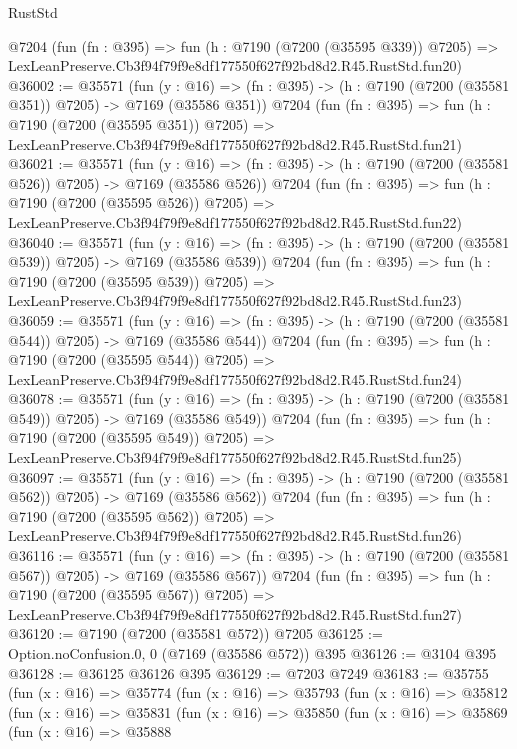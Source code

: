 \begin{lexlean}{RustStd}
\begin{coremodule}
    @7204
    (fun (fn : @395) =>
    fun (h : @7190 (@7200 (@35595 @339)) @7205) =>
    LexLeanPreserve.Cb3f94f79f9e8df177550f627f92bd8d2.R45.RustStd.fun20)
@36002 := @35571
    (fun (y : @16) => (fn : @395) -> (h : @7190 (@7200 (@35581 @351)) @7205) -> @7169 (@35586 @351))
    @7204
    (fun (fn : @395) =>
    fun (h : @7190 (@7200 (@35595 @351)) @7205) =>
    LexLeanPreserve.Cb3f94f79f9e8df177550f627f92bd8d2.R45.RustStd.fun21)
@36021 := @35571
    (fun (y : @16) => (fn : @395) -> (h : @7190 (@7200 (@35581 @526)) @7205) -> @7169 (@35586 @526))
    @7204
    (fun (fn : @395) =>
    fun (h : @7190 (@7200 (@35595 @526)) @7205) =>
    LexLeanPreserve.Cb3f94f79f9e8df177550f627f92bd8d2.R45.RustStd.fun22)
@36040 := @35571
    (fun (y : @16) => (fn : @395) -> (h : @7190 (@7200 (@35581 @539)) @7205) -> @7169 (@35586 @539))
    @7204
    (fun (fn : @395) =>
    fun (h : @7190 (@7200 (@35595 @539)) @7205) =>
    LexLeanPreserve.Cb3f94f79f9e8df177550f627f92bd8d2.R45.RustStd.fun23)
@36059 := @35571
    (fun (y : @16) => (fn : @395) -> (h : @7190 (@7200 (@35581 @544)) @7205) -> @7169 (@35586 @544))
    @7204
    (fun (fn : @395) =>
    fun (h : @7190 (@7200 (@35595 @544)) @7205) =>
    LexLeanPreserve.Cb3f94f79f9e8df177550f627f92bd8d2.R45.RustStd.fun24)
@36078 := @35571
    (fun (y : @16) => (fn : @395) -> (h : @7190 (@7200 (@35581 @549)) @7205) -> @7169 (@35586 @549))
    @7204
    (fun (fn : @395) =>
    fun (h : @7190 (@7200 (@35595 @549)) @7205) =>
    LexLeanPreserve.Cb3f94f79f9e8df177550f627f92bd8d2.R45.RustStd.fun25)
@36097 := @35571
    (fun (y : @16) => (fn : @395) -> (h : @7190 (@7200 (@35581 @562)) @7205) -> @7169 (@35586 @562))
    @7204
    (fun (fn : @395) =>
    fun (h : @7190 (@7200 (@35595 @562)) @7205) =>
    LexLeanPreserve.Cb3f94f79f9e8df177550f627f92bd8d2.R45.RustStd.fun26)
@36116 := @35571
    (fun (y : @16) => (fn : @395) -> (h : @7190 (@7200 (@35581 @567)) @7205) -> @7169 (@35586 @567))
    @7204
    (fun (fn : @395) =>
    fun (h : @7190 (@7200 (@35595 @567)) @7205) =>
    LexLeanPreserve.Cb3f94f79f9e8df177550f627f92bd8d2.R45.RustStd.fun27)
@36120 := @7190 (@7200 (@35581 @572)) @7205
@36125 := Option.noConfusion.{0, 0} (@7169 (@35586 @572)) @395
@36126 := @3104 @395
@36128 := @36125 @36126 @395
@36129 := @7203 @7249
@36183 := @35755
    (fun (x : @16) =>
    @35774
      (fun (x : @16) =>
      @35793
        (fun (x : @16) =>
        @35812
          (fun (x : @16) =>
          @35831
            (fun (x : @16) =>
            @35850
              (fun (x : @16) =>
              @35869
                (fun (x : @16) =>
                @35888

\end{coremodule}
\end{lexlean}
